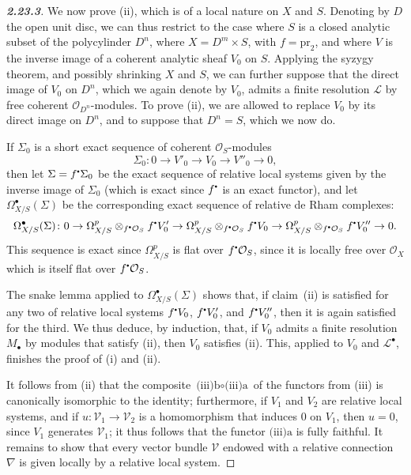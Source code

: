 \documentclass{report}
\newcommand{\scr}[1]{{\mathscr{#1}}}
\renewcommand{\cal}[1]{{\mathcal{#1}}}
\newcommand{\sbullet}{{\mathbin{\vcenter{\hbox{\scalebox{.5}{$\bullet$}}}}}}
\newcommand{\pr}{\mathrm{pr}}
\newcommand{\oldpage}[1]{\marginpar{\footnotesize$\Big\vert$ \textit{p.~#1}}}
\begin{document}
\begin{proof}[\normalfont\textbf{2.23.3}]
\label{I.2.23.3}
  We now prove (ii), which is of a local nature on $X$ and $S$.
  Denoting by $D$ the open unit disc, we can thus restrict to the case where $S$ is a closed analytic subset of the polycylinder $D^n$, where $X=D^m\times S$, with $f=\pr_2$, and where $V$ is the inverse image of a coherent analytic sheaf $V_0$ on $S$.
  Applying the syzygy theorem, and possibly shrinking $X$ and $S$, we can further suppose that the direct image of $V_0$ on $D^n$, which we again denote by $V_0$, admits a finite resolution $\scr{L}$ by free coherent $\cal{O}_{D^n}$-modules.
  To prove (ii), we are allowed to replace $V_0$ by its direct image on $D^n$, and to suppose that $D^n=S$, which we now do.

  If $\Sigma_0$ is a short exact sequence of coherent $\cal{O}_S$-modules
  \[
    \Sigma_0\colon 0 \to V'_0 \to V_0 \to V''_0 \to 0,
  \]
  then let $\Sigma=f^\sbullet\Sigma_0$ be the exact sequence of relative local systems given by the inverse image of $\Sigma_0$ (which is exact since $f^\sbullet$ is an exact functor), and let $\Omega_{X/S}^\bullet(\Sigma)$ be the corresponding exact sequence of relative de Rham complexes:
  \[
    \Omega_{X/S}^\bullet(\Sigma)\colon 0 \to \Omega_{X/S}^p\otimes_{f^\sbullet\cal{O}_S}f^\sbullet V'_0 \to \Omega_{X/S}^p\otimes_{f^\sbullet\cal{O}_S}f^\sbullet V_0 \to \Omega_{X/S}^p\otimes_{f^\sbullet\cal{O}_S}f^\sbullet V''_0 \to 0.
  \]
  This sequence is exact since $\Omega_{X/S}^p$ is flat over $f^\sbullet\cal{O}_S$, since it is locally free over $\cal{O}_X$ which is itself flat over $f^\sbullet\cal{O}_S$.

  The snake lemma applied to $\Omega_{X/S}^\bullet(\Sigma)$ shows that, if claim~(ii)
\oldpage{17}
  is satisfied for any two of relative local systems $f^\sbullet V_0$, $f^\sbullet V'_0$, and $f^\sbullet V''_0$, then it is again satisfied for the third.
  We thus deduce, by induction, that, if $V_0$ admits a finite resolution $M_\bullet$ by modules that satisfy (ii), then $V_0$ satisfies (ii).
  This, applied to $V_0$ and $\scr{L}^\bullet$, finishes the proof of (i) and (ii).

  It follows from (ii) that the composite $\mbox{(iii)b}\circ\mbox{(iii)a}$ of the functors from (iii) is canonically isomorphic to the identity;
  furthermore, if $V_1$ and $V_2$ are relative local systems, and if $u\colon\scr{V}_1\to\scr{V}_2$ is a homomorphism that induces $0$ on $V_1$, then $u=0$, since $V_1$ generates $\scr{V}_1$;
  it thus follows that the functor $\mbox{(iii)a}$ is fully faithful.
  It remains to show that every vector bundle $\scr{V}$ endowed with a relative connection $\nabla$ is given locally by a relative local system.


\end{proof}
\end{document}
